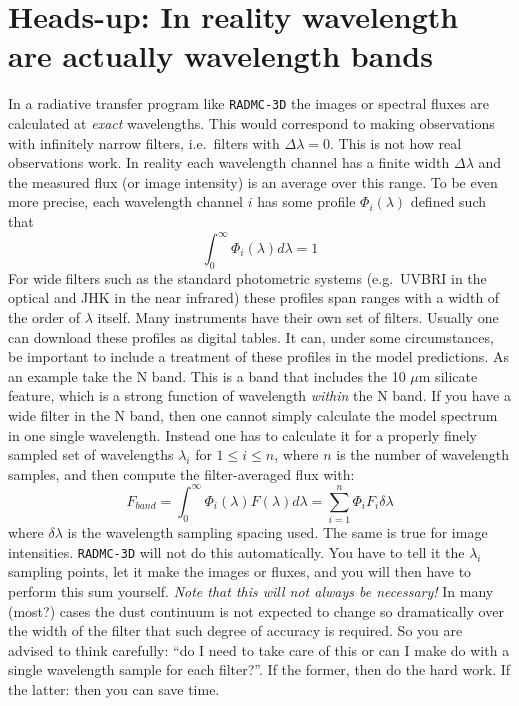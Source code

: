 \documentclass{report}
\begin{document}
\section{Heads-up: In reality wavelength are actually wavelength bands}
\label{sec-wavelength-bands}
%
In a radiative transfer program like {\small\tt RADMC-3D} the images or
spectral fluxes are calculated at {\em exact} wavelengths. This would
correspond to making observations with infinitely narrow filters, i.e.\
filters with $\Delta\lambda=0$. This is not how real observations work.
In reality each wavelength channel has a finite width $\Delta\lambda$ and
the measured flux (or image intensity) is an average over this range. To
be even more precise, each wavelength channel $i$ has some profile 
$\Phi_i(\lambda)$ defined such that
\begin{equation}
\int_0^{\infty}\Phi_i(\lambda)d\lambda=1
\end{equation}
For wide filters such as the standard photometric systems (e.g.\ UVBRI in
the optical and JHK in the near infrared) these profiles span ranges with a
width of the order of $\lambda$ itself. Many instruments have their own
set of filters. Usually one can download these profiles as digital tables.
It can, under some circumstances, be important to include a treatment of
these profiles in the model predictions. As an example take the N band. This
is a band that includes the 10 $\mu$m silicate feature, which is a strong
function of wavelength {\em within} the N band. If you have a wide filter in
the N band, then one cannot simply calculate the model spectrum in one single
wavelength. Instead one has to calculate it for a properly finely sampled
set of wavelengths $\lambda_i$ for $1\le i\le n$, where $n$ is the number of
wavelength samples, and then compute the filter-averaged flux with:
\begin{equation}
F_{band} = \int_0^{\infty}\Phi_i(\lambda)F(\lambda)d\lambda 
= \sum_{i=1}^{n} \Phi_i F_i \delta\lambda
\end{equation}
where $\delta\lambda$ is the wavelength sampling spacing used. The same is
true for image intensities. {\small\tt RADMC-3D} will not do this
automatically. You have to tell it the $\lambda_i$ sampling points, let it
make the images or fluxes, and you will then have to perform this sum
yourself. {\em Note that this will not always be necessary!} In many (most?)
cases the dust continuum is not expected to change so dramatically over the
width of the filter that such degree of accuracy is required. So you are
advised to think carefully: ``do I need to take care of this or can I make
do with a single wavelength sample for each filter?''. If the former, then
do the hard work. If the latter: then you can save time.
\end{document}
